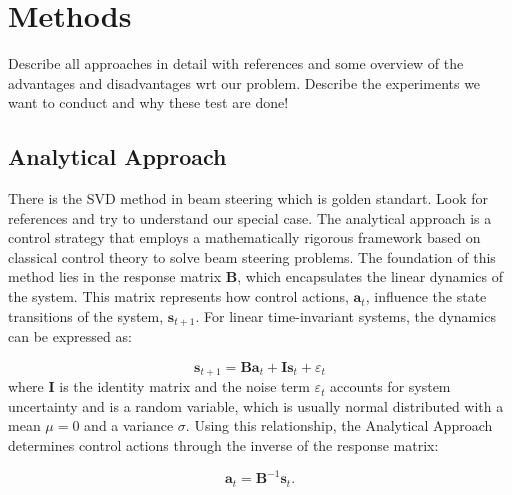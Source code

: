 \documentclass[journal,article,submit,pdftex,moreauthors]{Definitions/mdpi}
\begin{document}
\section{Methods}

Describe all approaches in detail with references and some overview of the advantages and disadvantages wrt our problem.
Describe the experiments we want to conduct and why these test are done!
\subsection{Analytical Approach}
There is the SVD method in beam steering which is golden standart. Look for references and try to understand our special case.
The analytical approach is a control strategy that employs a mathematically rigorous framework based on classical control theory to solve beam steering problems. The foundation of this method lies in the response matrix $\mathbf{B}$, which encapsulates the linear dynamics of the system. This matrix represents how control actions, $\mathbf{a}_t$, influence the state transitions of the system, $\mathbf{s}_{t+1}$. For linear time-invariant systems, the dynamics can be expressed as:

\begin{equation}
	\mathbf{s}_{t+1} = \mathbf{B} \mathbf{a}_t + \mathbf{I} \mathbf{s}_t + \varepsilon_t \label{eq:transition-dynamics}
\end{equation}
where $\mathbf{I}$ is the identity matrix and the noise term $ \varepsilon_t$ accounts for system uncertainty and is a random variable, which is usually normal distributed with a mean $\mu=0$ and a variance $\sigma$. Using this relationship, the Analytical Approach determines control actions through the inverse of the response matrix:

\begin{equation}
\mathbf{a}_t = \mathbf{B}^{-1} \mathbf{s}_t. \label{eq:inverse_response_policy}
\end{equation}
\end{document}
